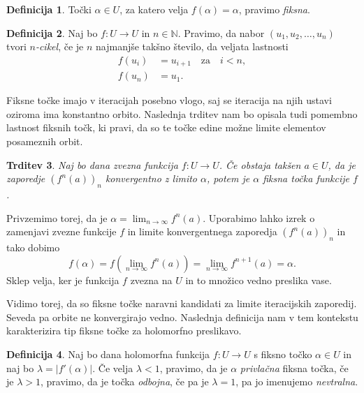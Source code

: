 \documentclass[12pt,a4paper]{amsart}
\theoremstyle{definition} %
\newtheorem{definicija}{Definicija}[section]
\theoremstyle{plain} %
\newtheorem{trditev}[definicija]{Trditev}
\newcommand{\N}{\mathbb N}
\begin{document}
\begin{definicija}\label{def:fixedPoint}
Točki $\alpha\in U$, za katero velja $f(\alpha)=\alpha$, pravimo {\em fiksna}.
\end{definicija}

\begin{definicija}\label{def:nCycle}
Naj bo $f \colon U \to U$ in $n \in \N$. Pravimo, da nabor $(u_1, u_2, \dots, u_n)$ tvori {\em$n$-cikel}, 
če je $n$ najmanjše takšno število, da veljata lastnosti
\begin{equation*}
\begin{aligned}
f(u_i) &= u_{i+1} \quad \text{za} \quad  i < n, \\
f(u_n) &= u_1.
\end{aligned}
\end{equation*}
\end{definicija}

\noindent Fiksne točke imajo v iteracijah posebno vlogo, 
saj se iteracija na njih ustavi oziroma ima konstantno orbito. 
Naslednja trditev nam bo opisala tudi pomembno lastnost fiksnih točk,
ki pravi, da so te točke edine možne limite elementov posameznih orbit.

\begin{trditev}\label{trd:fixedPointConvergance}
Naj bo dana zvezna funkcija $f \colon U \to U$. 
Če obstaja takšen $a \in U$, da je zaporedje $(f^n(a))_n$ konvergentno z limito $\alpha$,
potem je $\alpha$ {\em fiksna točka} funkcije $f$.
\end{trditev}

\proof
Privzemimo torej, da je $\alpha = \lim_{n \to \infty}f^n(a)$. 
Uporabimo lahko izrek o zamenjavi zvezne funkcije $f$ in limite konvergentnega zaporedja $(f^n(a))_n$ in tako dobimo
$$f(\alpha) = f(\lim_{n \to \infty} f^n(a)) = \lim_{n \to \infty} f^{n+1}(a) = \alpha.$$
Sklep velja, ker je funkcija $f$ zvezna na $U$ in to množico vedno preslika vase.
\endproof

Vidimo torej, da so fiksne točke naravni kandidati za limite iteracijskih zaporedij.
Seveda pa orbite ne konvergirajo vedno.
Naslednja definicija nam v tem kontekstu karakterizira tip fiksne točke za holomorfno preslikavo.

\begin{definicija}\label{def:fixedPointTypes}
Naj bo dana holomorfna funkcija $f \colon U \to U$ s fiksno točko $\alpha \in U$ in naj bo $\lambda = |f'(\alpha)|$.
Če velja $\lambda < 1$, pravimo, da je $\alpha$ {\em privlačna} fiksna točka, če je $\lambda > 1$, pravimo, da je točka {\em odbojna}, 
če pa je $\lambda = 1$, pa jo imenujemo {\em nevtralna}. 
\end{definicija}
\end{document}
